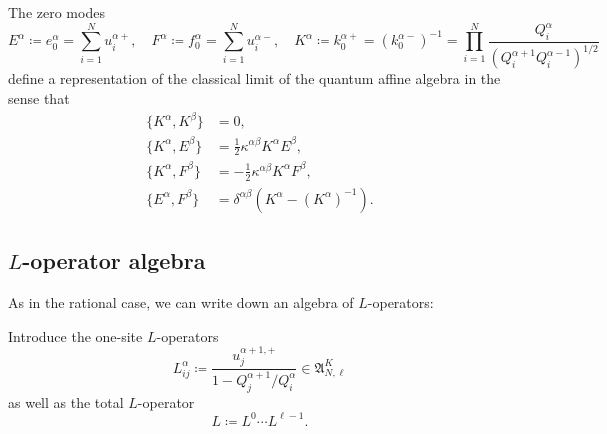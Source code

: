 \begin{corollary}
    The zero modes
    \begin{equation}
        E^\alpha \coloneq e_0^\alpha = \sum_{i=1}^N u_i^{\alpha+}, \quad F^\alpha \coloneq f_0^\alpha = \sum_{i=1}^N u_i^{\alpha-}, \quad K^\alpha \coloneq k_0^{\alpha+} = (k_0^{\alpha-})^{-1} = \prod_{i=1}^N \frac{Q_i^\alpha}{(Q_i^{\alpha+1} Q_i^{\alpha-1})^{1/2}}
    \end{equation}
    define a representation of the classical limit of the quantum affine algebra in the sense that
    \begin{align}
        \{ K^\alpha,K^\beta \} &= 0,
        \\[4pt]
        \{ K^\alpha,E^\beta \} &= \tfrac{1}{2} \kappa^{\alpha\beta} K^\alpha E^\beta,
        \\[4pt]
        \{ K^\alpha, F^\beta\} &= -\tfrac{1}{2} \kappa^{\alpha\beta} K^\alpha F^\beta,
        \\[4pt]
        \{ E^\alpha,F^\beta \} &= \delta^{\alpha\beta} (K^\alpha - (K^\alpha)^{-1}).
    \end{align}
\end{corollary}

\subsection{$L$-operator algebra}

As in the rational case, we can write down an algebra of $L$-operators:

\begin{definition}
    Introduce the one-site $L$-operators
    \begin{equation}
        L_{ij}^\alpha \coloneq \frac{u_j^{\alpha+1,+}}{1-Q_j^{\alpha+1}/Q_i^\alpha} \in \mathfrak{A}_{N,\ell}^K
    \end{equation}
    as well as the total $L$-operator
    \begin{equation}\label{eq:totLHyp}
        L \coloneq L^0 \cdots L^{\ell-1}.
    \end{equation}
\end{definition}

